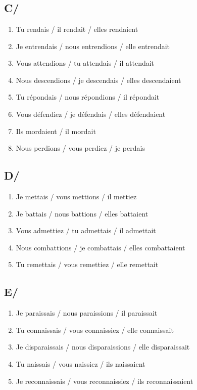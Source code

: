 \section{}
\subsection{C/}

\begin{enumerate}
    \item Tu rendais / il rendait / elles rendaient
    \item Je entrendais / nous entrendions / elle entrendait
    \item Vous attendions / tu attendais / il attendait
    \item Nous descendions / je descendais / elles descendaient
    \item Tu répondais / nous répondions / il répondait
    \item Vous défendiez / je défendais / elles défendaient
    \item Ils mordaient / il mordait 
    \item Nous perdions / vous perdiez / je perdais
\end{enumerate}

\subsection{D/}

\begin{enumerate}
    \item Je mettais / vous mettions / il mettiez
    \item Je battais / nous battions / elles battaient
    \item Vous admettiez / tu admettais / il admettait
    \item Nous combattions / je combattais / elles combattaient
    \item Tu remettais / vous remettiez / elle remettait
\end{enumerate}

\subsection{E/}

\begin{enumerate}
    \item Je paraissais / nous paraissions / il paraissait
    \item Tu connaissais / vous connaissiez / elle connaissait
    \item Je disparaissais / nous disparaissions / elle disparaissait
    \item Tu naissais / vous naissiez / ils naissaient
    \item Je reconnaissais / vous reconnaissiez / ils reconnaissaient
\end{enumerate}

